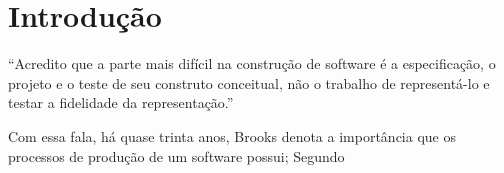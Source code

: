 \section{Introdução}

``Acredito que a parte mais difícil na construção de software é a especificação, o projeto e o teste de seu construto
conceitual, não o trabalho de representá-lo e testar a fidelidade da representação.'' \cite{brooks:95}

Com essa fala, há quase trinta anos, Brooks denota a importância que os processos de produção de um software possui;
Segundo \cite{ford:23}
